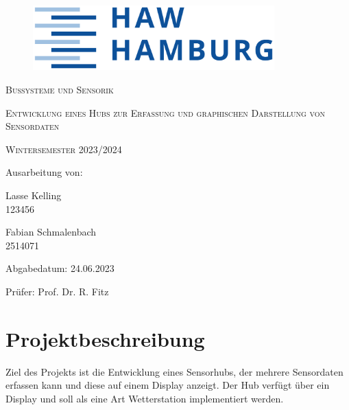 \documentclass[a4paper,11pt]{article}
\begin{document}
\begin{titlepage}

\begin{figure}
 \centering
 \includegraphics[height=2.5cm]{HAWLogo}
\end{figure}

\vspace*{2cm}
\centering
{\scshape\Large Bussysteme und Sensorik \par}
\vspace{1cm}
{\scshape\LARGE Entwicklung eines Hubs zur Erfassung und graphischen Darstellung von Sensordaten \par}
\vspace{0.5cm}
{\scshape\large Wintersemester 2023/2024 \par}
\vspace{5cm}

\raggedright
Ausarbeitung von:

\vspace{0.5cm}
Lasse Kelling \\
123456 %

\vspace{0.2cm}
Fabian Schmalenbach \\
2514071

\vspace{0.5cm}
Abgabedatum: 24.06.2023

\vspace{0.5cm}
Prüfer: Prof. Dr. R. Fitz



\end{titlepage}

\newpage
{}
\tableofcontents
\thispagestyle{empty}
\newpage

\setcounter{page}{1}    %

\section{Projektbeschreibung}
\label{sub:projektbeschreibung}

Ziel des Projekts ist die Entwicklung eines Sensorhubs, der mehrere Sensordaten erfassen kann und diese
auf einem Display anzeigt. Der Hub verfügt über ein Display und soll als eine Art Wetterstation implementiert werden. 
\end{document}
